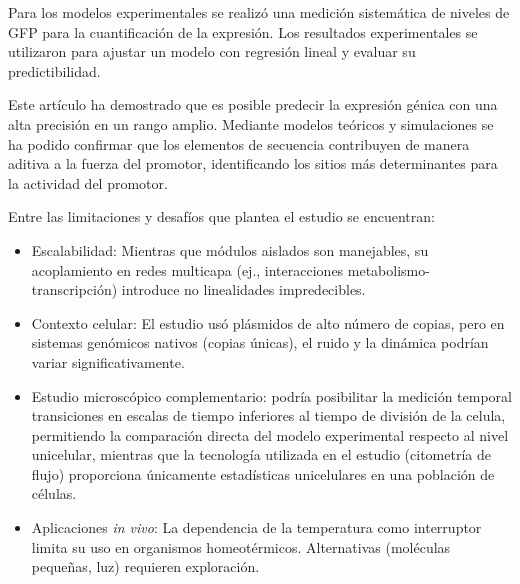 \documentclass[nochap]{config/ejercicios}
\begin{document}
Para los modelos experimentales se realizó una medición sistemática de niveles de GFP para la cuantificación de la expresión. Los resultados experimentales se utilizaron para ajustar un modelo con regresión lineal y evaluar su predictibilidad. 


Este artículo ha demostrado que es posible predecir la expresión génica con una alta precisión en un rango amplio. Mediante modelos teóricos y simulaciones se ha podido confirmar que los elementos de secuencia contribuyen de manera aditiva a la fuerza del promotor, identificando los sitios más determinantes para la actividad del promotor.



Entre las limitaciones y desafíos que plantea el estudio se encuentran:
\begin{itemize}
    \item Escalabilidad: Mientras que módulos aislados son manejables, su acoplamiento en redes multicapa (ej., interacciones metabolismo-transcripción) introduce no linealidades impredecibles.
    \item Contexto celular: El estudio usó plásmidos de alto número de copias, pero en sistemas genómicos nativos (copias únicas), el ruido y la dinámica podrían variar significativamente.
    \item Estudio microscópico complementario: podría posibilitar la medición temporal transiciones en escalas de tiempo inferiores al tiempo de división de la celula, permitiendo la comparación directa del modelo experimental respecto al nivel unicelular, mientras que la tecnología utilizada en el estudio (citometría de flujo) proporciona únicamente estadísticas unicelulares en una población de células.
    \item Aplicaciones \textit{in vivo}: La dependencia de la temperatura como interruptor limita su uso en organismos homeotérmicos. Alternativas (moléculas pequeñas, luz) requieren exploración.
\end{itemize}
\end{document}

